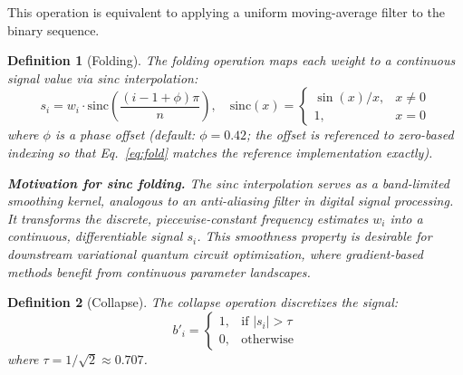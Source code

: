 ﻿\documentclass[12pt,a4paper]{article}
\newtheorem{definition}{Definition}[section]
\begin{document}
This operation is equivalent to applying a uniform moving-average filter to the binary sequence.

\begin{definition}[Folding]
The folding operation maps each weight to a continuous signal value via sinc interpolation:
\begin{equation}
    s_i = w_i \cdot \mathrm{sinc}\!\left(\frac{(i - 1 + \phi)\pi}{n}\right), \quad \mathrm{sinc}(x) = \begin{cases} \sin(x)/x, & x \neq 0 \\ 1, & x = 0 \end{cases}
    \label{eq:fold}
\end{equation}
where $\phi$ is a phase offset (default: $\phi = 0.42$; the offset is referenced to zero-based indexing so that Eq.~\eqref{eq:fold} matches the reference implementation exactly).

\textbf{Motivation for sinc folding.} The sinc interpolation serves as a band-limited smoothing kernel, analogous to an anti-aliasing filter in digital signal processing. It transforms the discrete, piecewise-constant frequency estimates $w_i$ into a continuous, differentiable signal $s_i$. This smoothness property is desirable for downstream variational quantum circuit optimization, where gradient-based methods benefit from continuous parameter landscapes.
\end{definition}

\begin{definition}[Collapse]
The collapse operation discretizes the signal:
\begin{equation}
    b'_i = \begin{cases} 1, & \text{if } |s_i| > \tau \\ 0, & \text{otherwise} \end{cases}
\end{equation}
where $\tau = 1/\sqrt{2} \approx 0.707$.
\end{definition}
\end{document}
